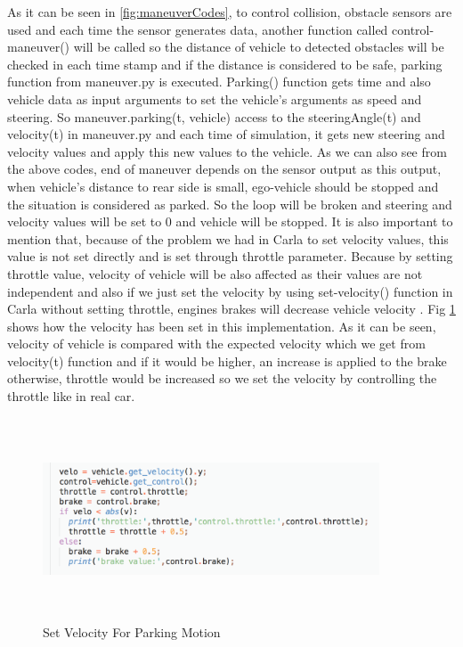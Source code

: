 As it can be seen in \ref{fig:maneuverCodes}, to control collision, obstacle sensors are used and each time the sensor generates data, another function called control-maneuver() will be called so the distance of vehicle to detected obstacles will be checked in each time stamp and if the distance is considered to be safe, parking function from maneuver.py is executed. Parking() function gets time and also vehicle data as input arguments to set the vehicle's arguments as speed and steering. So maneuver.parking(t, vehicle) access to the steeringAngle(t) and velocity(t) in maneuver.py and each time of simulation, it gets new steering and velocity values and apply this new values to the vehicle. As we can also see from the above codes, end of maneuver depends on the sensor output as this output, when vehicle's distance to rear side is small, ego-vehicle should be stopped and the situation is considered as parked. So the loop will be broken and steering and velocity values will be set to 0 and vehicle will be stopped. 
It is also important to mention that, because of the problem we had in Carla to set velocity values, this value is not set directly and is set through throttle parameter. Because by setting throttle value, velocity of vehicle will be also affected as their values are not independent and also if we just set the velocity by using set-velocity() function in Carla without setting throttle, engines brakes will decrease vehicle velocity \cite{setVelocity}. Fig \ref{fig:velo} shows how the velocity has been set in this implementation. As it can be seen, velocity of vehicle is compared with the expected velocity which we get from velocity(t) function and if it would be higher, an increase is applied to the brake otherwise, throttle would be increased so we set the velocity by controlling the throttle like in real car.
\begin{figure}
\centering
    \includegraphics[width=10cm, height=6cm]{images/velo.pdf} 
    \caption{Set Velocity For Parking Motion}
    \label{fig:velo}
\end{figure}
